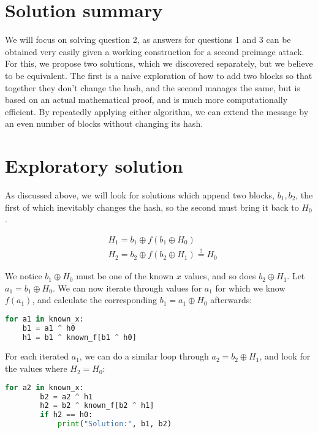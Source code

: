 \documentclass[11pt]{llncs}
\begin{document}
\newpage
\section{Solution summary}

We will focus on solving question 2, as answers for questions 1 and 3 can be obtained very easily given a working construction for a second preimage attack. For this, we propose two solutions, which we discovered separately, but we believe to be equivalent. The first is a naive exploration of how to add two blocks so that together they don't change the hash, and the second manages the same, but is based on an actual mathematical proof, and is much more computationally efficient. By repeatedly applying either algorithm, we can extend the message by an even number of blocks without changing its hash.

\section{Exploratory solution}

As discussed above, we will look for solutions which append two blocks, $b_1, b_2$, the first of which inevitably changes the hash, so the second must bring it back to $H_0$.

\[ \begin{aligned}
& H_1 = b_1 \oplus f(b_1 \oplus H_0) \\
& H_2 = b_2 \oplus f(b_2 \oplus H_1) \stackrel{!}{=} H_0
\end{aligned} \]

We notice $b_1 \oplus H_0$ must be one of the known $x$ values, and so does 
$b_2 \oplus H_1$. Let $a_1 = b_1 \oplus H_0$. We can now iterate through values for $a_1$ for which we know $f(a_1)$, and calculate the corresponding $b_1 = a_1 \oplus H_0$ afterwards:

\begin{lstlisting}[basicstyle=\ttfamily,language=Python,showstringspaces=false]
for a1 in known_x:
	b1 = a1 ^ h0
	h1 = b1 ^ known_f[b1 ^ h0]
\end{lstlisting}
For each iterated $a_1$, we can do a similar loop through $a_2 = b_2 \oplus H_1$, and look for the values where $H_2 = H_0$:
\begin{lstlisting}[basicstyle=\ttfamily,language=Python,showstringspaces=false]
	for a2 in known_x:
		b2 = a2 ^ h1
		h2 = b2 ^ known_f[b2 ^ h1]
		if h2 == h0:
			print("Solution:", b1, b2)
\end{lstlisting}
\end{document}
